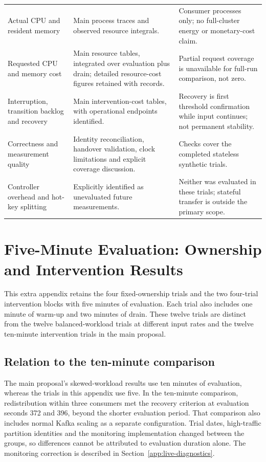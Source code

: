 \documentclass[10pt]{article}
\begin{document}
\begin{longtable}{@{}>{\raggedright\arraybackslash}p{.22\linewidth}>{\raggedright\arraybackslash}p{.42\linewidth}>{\raggedright\arraybackslash}p{.29\linewidth}@{}}
Actual CPU and resident memory & Main process traces and observed resource integrals. & Consumer processes only; no full-cluster energy or monetary-cost claim.\\
Requested CPU and memory cost & Main resource tables, integrated over evaluation plus drain; detailed resource-cost figures retained with records. & Partial request coverage is unavailable for full-run comparison, not zero.\\
Interruption, transition backlog and recovery & Main intervention-cost tables, with operational endpoints identified. & Recovery is first threshold confirmation while input continues; not permanent stability.\\
Correctness and measurement quality & Identity reconciliation, handover validation, clock limitations and explicit coverage discussion. & Checks cover the completed stateless synthetic trials.\\
Controller overhead and hot-key splitting & Explicitly identified as unevaluated future measurements. & Neither was evaluated in these trials; stateful transfer is outside the primary scope.\\
\bottomrule
\end{longtable}
\endgroup

\clearpage
\tableofcontents
\clearpage
\clearpage
\section{Five-Minute Evaluation: Ownership and Intervention Results}
\label{app:five-minute-results}

This extra appendix retains the four fixed-ownership trials and the two four-trial intervention blocks with five minutes of evaluation. Each trial also includes one minute of warm-up and two minutes of drain. These twelve trials are distinct from the twelve balanced-workload trials at different input rates and the twelve ten-minute intervention trials in the main proposal.

\subsection{Relation to the ten-minute comparison}
The main proposal's skewed-workload results use ten minutes of evaluation, whereas the trials in this appendix use five. In the ten-minute comparison, redistribution within three consumers met the recovery criterion at evaluation seconds 372 and 396, beyond the shorter evaluation period. That comparison also includes normal Kafka scaling as a separate configuration. Trial dates, high-traffic partition identities and the monitoring implementation changed between the groups, so differences cannot be attributed to evaluation duration alone. The monitoring correction is described in Section~\ref{app:live-diagnostics}.
\end{document}
